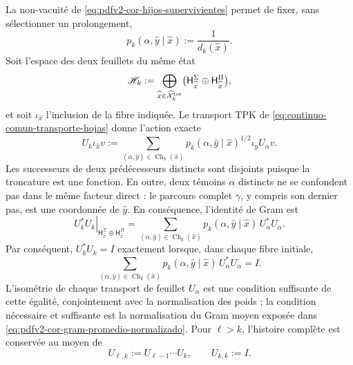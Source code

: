 La non-vacuité de \eqref{eq:pdfv2-cor-hijos-supervivientes} permet de fixer, sans sélectionner un prolongement,
\begin{equation}
\label{eq:pdfv2-cor-peso-conteo}
 p_k(\alpha,\widehat y\mid\widehat x)
 :=\frac1{d_k(\widehat x)}.
\end{equation}
Soit l'espace des deux feuillets du même état
\begin{equation}
\label{eq:pdfv2-cor-hilbert-hojas}
 \mathscr H_k:=
 \bigoplus_{\widehat x\in\widehat{\mathcal X}^{\rm tot}_k}
 \bigl(\mathsf H_{\widehat x}^{\Sigma}
       \oplus\mathsf H_{\widehat x}^{\Pi}\bigr),
\end{equation}
et soit \(\iota_{\widehat x}\) l'inclusion de la fibre indiquée. Le transport TPK de \eqref{eq:continuo-comun-transporte-hojas} donne l'action exacte
\begin{equation}
\label{eq:pdfv2-cor-u-comun}
 U_k\iota_{\widehat x}v:=
 \sum_{(\alpha,\widehat y)\in\operatorname{Ch}_k(\widehat x)}
 p_k(\alpha,\widehat y\mid\widehat x)^{1/2}
 \iota_{\widehat y}U_\alpha v.
\end{equation}
Les successeurs de deux prédécesseurs distincts sont disjoints puisque la troncature est une fonction. En outre, deux témoins \(\alpha\) distincts ne se confondent pas dans le même facteur direct : le parcours complet \(\gamma\), y compris son dernier pas, est une coordonnée de \(\widehat y\). En conséquence, l'identité de Gram est
\begin{equation}
\label{eq:pdfv2-cor-u-gram}
 \left.U_k^*U_k\right|_{\mathsf H_{\widehat x}^{\Sigma}
       \oplus\mathsf H_{\widehat x}^{\Pi}}
 =
 \sum_{(\alpha,\widehat y)\in\operatorname{Ch}_k(\widehat x)}
 p_k(\alpha,\widehat y\mid\widehat x)\,U_\alpha^*U_\alpha.
\end{equation}
Par conséquent, \(U_k^*U_k=I\) exactement lorsque, dans chaque fibre initiale,
\begin{equation}
\label{eq:pdfv2-cor-gram-promedio-normalizado}
 \sum_{(\alpha,\widehat y)\in\operatorname{Ch}_k(\widehat x)}
 p_k(\alpha,\widehat y\mid\widehat x)\,U_\alpha^*U_\alpha=I.
\end{equation}
L'isométrie de chaque transport de feuillet \(U_\alpha\) est une condition suffisante de cette égalité, conjointement avec la normalisation des poids ; la condition nécessaire et suffisante est la normalisation du Gram moyen exposée dans \eqref{eq:pdfv2-cor-gram-promedio-normalizado}. Pour \(\ell>k\), l'histoire complète est conservée au moyen de
\begin{equation}
\label{eq:pdfv2-cor-u-iterado}
 U_{\ell,k}:=U_{\ell-1}\cdots U_k,
 \qquad U_{k,k}:=I.
\end{equation}

